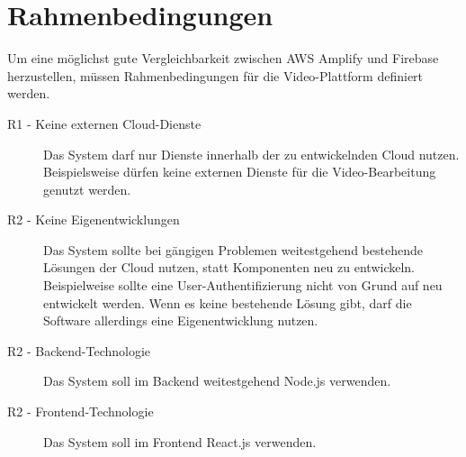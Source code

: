 \section{Rahmenbedingungen}

Um eine möglichst gute Vergleichbarkeit zwischen AWS Amplify und Firebase herzustellen, müssen Rahmenbedingungen für die Video-Plattform definiert werden.

\begin{description}
   \item[R1 - Keine externen Cloud-Dienste] Das System darf nur Dienste innerhalb der zu entwickelnden Cloud nutzen. Beispielsweise dürfen keine externen Dienste für die Video-Bearbeitung genutzt werden.
   \item[R2 - Keine Eigenentwicklungen] Das System sollte bei gängigen Problemen weitestgehend bestehende Lösungen der Cloud nutzen, statt Komponenten neu zu entwickeln. Beispielweise sollte eine User-Authentifizierung nicht von Grund auf neu entwickelt werden. Wenn es keine bestehende Lösung gibt, darf die Software allerdings eine Eigenentwicklung nutzen.
   \item[R2 - Backend-Technologie] Das System soll im Backend weitestgehend Node.js verwenden.
   \item[R2 - Frontend-Technologie] Das System soll im Frontend React.js verwenden.
\end{description}